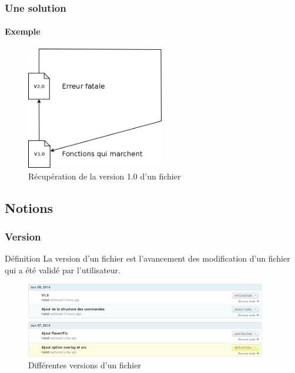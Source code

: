 	\begin{frame}
		\frametitle{Une solution}
		\framesubtitle{Exemple}
		\begin{figure}
			\centering
			\includegraphics[width=60mm]{./Img/RevertFich.png}
			\caption{Récupération de la  version 1.0 d'un fichier}
		\end{figure}
	\end{frame}



\subsection{Notions}
	


	\begin{frame}
	\frametitle{Version}
		\begin{block}{Définition}
			La version d'un fichier est l'avancement des modification d'un fichier qui a été validé par l'utilisateur.
		\end{block}
		\begin{figure}
		  \centering
		  \includegraphics[width=105mm]{./Img/VersionFich.png}
		  \caption{Différentes versions d'un fichier}
		\end{figure}

	\end{frame}

